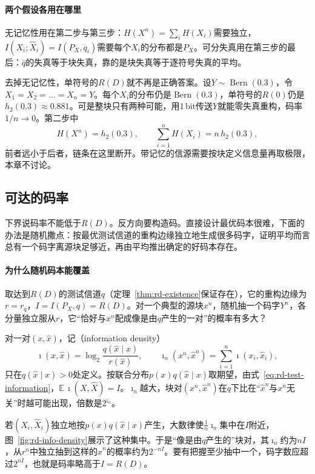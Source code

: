 \paragraph{两个假设各用在哪里}
无记忆性用在第二步与第三步：$H(X^{n})=\sum_iH(X_i)$需要独立，$I(X_i;\hat{X}_i)=I(P_X,q_i)$需要每个$X_i$的分布都是$P_X$。可分失真用在第三步的最后：$\bar{q}$的失真等于块失真，靠的是块失真等于逐符号失真的平均。

去掉无记忆性，单符号的$R(D)$就不再是正确答案。设$Y\sim\operatorname{Bern}(0.3)$，令$X_1=X_2=\dots=X_n=Y$。每个$X_i$的分布仍是$\operatorname{Bern}(0.3)$，单符号的$R(0)$仍是$h_2(0.3)\approx0.881$。可是整块只有两种可能，用$1$\,bit传送$Y$就能零失真重构，码率$1/n\to0$。第二步中
\[
  H(X^{n})=h_2(0.3),\qquad \sum_{i=1}^{n}H(X_i)=n\,h_2(0.3),
\]
前者远小于后者，链条在这里断开。带记忆的信源需要按块定义信息量再取极限，本章不讨论。

\subsection{可达的码率}
\label{sec:rd-achievability}

下界说码率不能低于$R(D)$。反方向要构造码。直接设计最优码本很难，下面的办法是随机撒点：按最优测试信道的重构边缘独立地生成很多码字，证明平均而言总有一个码字离源块足够近，再由平均推出确定的好码本存在。

\paragraph{为什么随机码本能覆盖}
取达到$R(D)$的测试信道$q$（定理~\ref{thm:rd-existence}保证存在），它的重构边缘为$r=r_q$，$I=I(P_X,q)=R(D)$。对一个典型的源块$x^{n}$，随机抽一个码字$Y^{n}$，各分量独立服从$r$，它“恰好与$x^{n}$配成像是由$q$产生的一对”的概率有多大？

对一对$(x,\hat{x})$，记（information density）
\begin{equation}
  \imath(x,\hat{x})=\log_2\frac{q(\hat{x}\mid x)}{r(\hat{x})},\qquad
  \imath_n(x^{n},\hat{x}^{n})=\sum_{i=1}^{n}\imath(x_i,\hat{x}_i),
  \label{eq:rd-information-density}
\end{equation}
只在$q(\hat{x}\mid x)>0$处定义。按联合分布$p(x)q(\hat{x}\mid x)$取期望，由式~\eqref{eq:rd-test-information}，$\mathbb{E}\,\imath(X,\hat{X})=I$。$\imath_n$越大，块对$(x^{n},\hat{x}^{n})$在$q$下比在“$\hat{x}^{n}$与$x^{n}$无关”时越可能出现，倍数是$2^{\imath_n}$。

若$(X_i,\hat{X}_i)$独立地按$p(x)q(\hat{x}\mid x)$产生，大数律使$\frac1n\imath_n$集中在$I$附近，图~\ref{fig:rd-info-density}展示了这种集中。于是“像是由$q$产生的”块对，其$\imath_n$约为$nI$，从$r^{n}$中独立抽到这样的$\hat{x}^{n}$的概率约为$2^{-nI}$。要有把握至少抽中一个，码字数应超过$2^{nI}$，也就是码率略高于$I=R(D)$。

